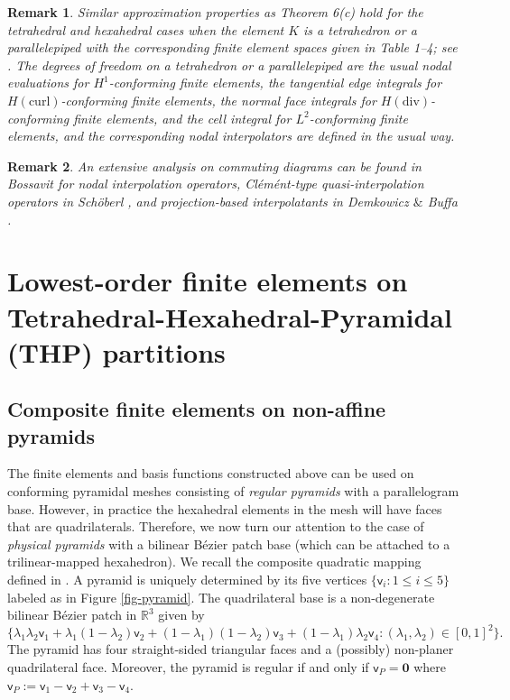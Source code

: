 \documentclass[twoside,reqno,final]{amsart}
\newcommand\gfu[1]{\textcolor{red}{#1}}
\newtheorem{remark}{Remark}
\renewcommand{\b}[1]{{\boldsymbol{#1}}}
\newcommand{\vt}{\mathsf{v}}
\newcommand{\bR}{\mathbb R}
\begin{document}
\begin{remark}
Similar approximation properties as Theorem 6(c) hold for the tetrahedral and hexahedral cases when the element 
$K$ is a tetrahedron or a parallelepiped with the corresponding finite element spaces given in Table 1--4; 
see \cite[Chapter 5,6]{Monk03}.
The degrees of freedom on a tetrahedron or a parallelepiped
are the usual nodal evaluations for $H^1$-conforming finite elements, 
the tangential edge integrals for $H(\mathrm{curl})$-conforming finite elements, the normal face integrals for $H(\mathrm{div})$-conforming finite elements, and 
the cell integral for $L^2$-conforming finite elements,
and the corresponding nodal interpolators are defined in the usual way.
\end{remark}
\begin{remark}
An extensive analysis on commuting diagrams can be found in Bossavit \cite{Bossavit98} for nodal interpolation operators,
Cl\'em\'ent-type { quasi-interpolation} operators in Sch\"oberl \cite{Schoberl08}, 
and projection-based interpolatants in {Demkowicz $\&$ Buffa} \cite{DemkowiczBuffa05}. 
\end{remark}


\section{Lowest-order finite elements on Tetrahedral-Hexahedral-Pyramidal ({\sf THP}) partitions}
\subsection{Composite finite elements on non-affine pyramids}
The finite elements and basis functions constructed above can be used on conforming pyramidal meshes 
consisting of {\it regular pyramids} with a parallelogram base. 
However, in practice the hexahedral elements in the mesh will have faces that are quadrilaterals. Therefore, we now turn our attention to 
%
the case of {\it physical pyramids} with a bilinear 
B\'ezier patch base (which can be attached to a trilinear-mapped hexahedron). 
We recall the composite quadratic mapping defined in \cite{AinsworthDavydovSchumaker16}.
A pyramid is uniquely determined by its five vertices $\{\vt_i:1\le i\le5\}$
labeled as in Figure \ref{fig-pyramid}. The quadrilateral base  is
a non-degenerate bilinear B\'ezier patch in $\bR^3$ given by 
\[
\{
\lambda_1 \lambda_2\vt_1
+\lambda_1 (1-\lambda_2)\vt_2
+(1-\lambda_1)(1- \lambda_2)\vt_3
+(1-\lambda_1) \lambda_2\vt_4:(\lambda_1,\lambda_2)\in [0,1]^2
 \}.\]
The pyramid has four straight-sided triangular faces and a (possibly) non-planer quadrilateral face.
Moreover, the pyramid is regular if and only if $\vt_P = \b 0$ where
 $\vt_P := \vt_{1}-\vt_{2}+\vt_3-\vt_4$.
\end{document}
